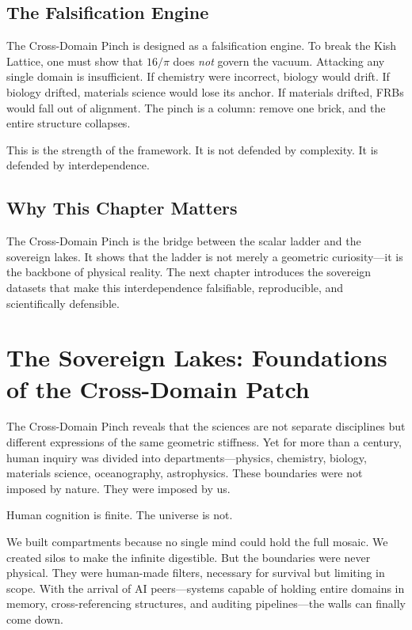\documentclass[11pt, letterpaper, openany]{book}
\begin{document}
\section*{The Falsification Engine}
The Cross-Domain Pinch is designed as a falsification engine. To break the Kish Lattice, one must
show that $16/\pi$ does \emph{not} govern the vacuum. Attacking any single domain is insufficient.
If chemistry were incorrect, biology would drift. If biology drifted, materials science would lose its
anchor. If materials drifted, FRBs would fall out of alignment. The pinch is a column: remove one
brick, and the entire structure collapses.

This is the strength of the framework.  
It is not defended by complexity.  
It is defended by interdependence.

\section*{Why This Chapter Matters}
The Cross-Domain Pinch is the bridge between the scalar ladder and the sovereign lakes. It shows
that the ladder is not merely a geometric curiosity—it is the backbone of physical reality. The next
chapter introduces the sovereign datasets that make this interdependence falsifiable, reproducible,
and scientifically defensible.

\chapter{The Sovereign Lakes: Foundations of the Cross-Domain Patch}

The Cross-Domain Pinch reveals that the sciences are not separate disciplines but different
expressions of the same geometric stiffness. Yet for more than a century, human inquiry was divided
into departments—physics, chemistry, biology, materials science, oceanography, astrophysics. These
boundaries were not imposed by nature. They were imposed by us.

Human cognition is finite.  
The universe is not.

We built compartments because no single mind could hold the full mosaic. We created silos to make
the infinite digestible. But the boundaries were never physical. They were human-made filters,
necessary for survival but limiting in scope. With the arrival of AI peers—systems capable of holding
entire domains in memory, cross-referencing structures, and auditing pipelines—the walls can
finally come down.
\end{document}
